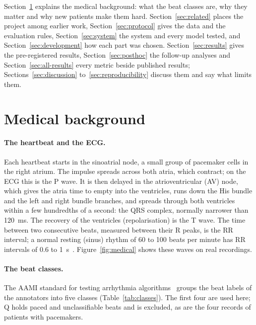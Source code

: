 \documentclass[11pt]{article}
\begin{document}
Section~\ref{sec:medical} explains the medical background: what the beat classes are, why they matter and why new patients make
them hard. Section~\ref{sec:related} places the project among earlier work, Section~\ref{sec:protocol} gives the data and the evaluation
rules, Section~\ref{sec:system} the system and every model tested, and Section~\ref{sec:development} how each part was chosen.
Section~\ref{sec:results} gives the pre-registered results, Section~\ref{sec:posthoc} the follow-up analyses and
Section~\ref{sec:all-results} every metric beside published results; Sections~\ref{sec:discussion} to~\ref{sec:reproducibility} discuss
them and say what limits them.

\section{Medical background}\label{sec:medical}

\paragraph{The heartbeat and the ECG.} Each heartbeat starts in the sinoatrial node, a small group of pacemaker cells in the right
atrium. The impulse spreads across both atria, which contract; on the ECG this is the P wave. It is then delayed in the
atrioventricular (AV) node, which gives the atria time to empty into the ventricles, runs down the His bundle and the left and right
bundle branches, and spreads through both ventricles within a few hundredths of a second: the QRS complex, normally narrower than
120~ms. The recovery of the ventricles (repolarisation) is the T wave. The time between two consecutive beats, measured between their
R peaks, is the RR interval; a normal resting (sinus) rhythm of 60 to 100 beats per minute has RR intervals of 0.6 to
1~s~\cite{goldberger2017}. Figure~\ref{fig:medical} shows these waves on real recordings.

\paragraph{The beat classes.} The AAMI standard for testing arrhythmia algorithms~\cite{aami2012ec57} groups the beat labels of the
annotators into five classes (Table~\ref{tab:classes}). The first four are used here; Q holds paced and unclassifiable beats and is
excluded, as are the four records of patients with pacemakers.
\end{document}
